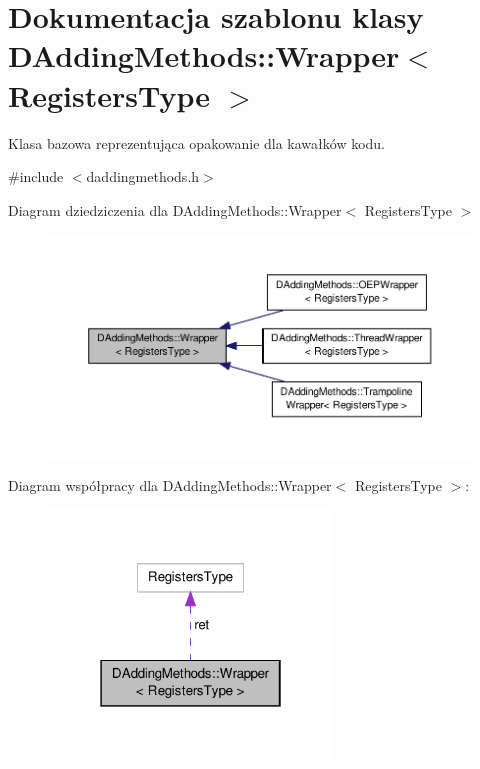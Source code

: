 \hypertarget{class_d_adding_methods_1_1_wrapper}{\section{Dokumentacja szablonu klasy D\-Adding\-Methods\-:\-:Wrapper$<$ Registers\-Type $>$}
\label{class_d_adding_methods_1_1_wrapper}
}


Klasa bazowa reprezentująca opakowanie dla kawałków kodu.  




{\ttfamily \#include $<$daddingmethods.\-h$>$}



Diagram dziedziczenia dla D\-Adding\-Methods\-:\-:Wrapper$<$ Registers\-Type $>$\nopagebreak
\begin{figure}[H]
\begin{center}
\leavevmode
\includegraphics[width=350pt]{class_d_adding_methods_1_1_wrapper__inherit__graph}
\end{center}
\end{figure}


Diagram współpracy dla D\-Adding\-Methods\-:\-:Wrapper$<$ Registers\-Type $>$\-:\nopagebreak
\begin{figure}[H]
\begin{center}
\leavevmode
\includegraphics[width=214pt]{class_d_adding_methods_1_1_wrapper__coll__graph}
\end{center}
\end{figure}
